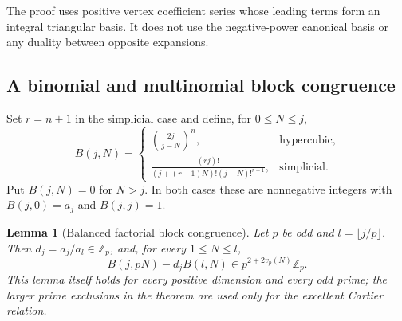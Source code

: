 \documentclass[11pt,a4paper]{article}
\newtheorem{lemma}[theorem]{Lemma}
\theoremstyle{definition}\newtheorem{definition}[theorem]{Definition}
\theoremstyle{remark}\newtheorem{remark}[theorem]{Remark}
\numberwithin{equation}{section}
\begin{document}
The proof uses positive vertex coefficient series whose leading
terms form an integral triangular basis.  It does not use the
negative-power canonical basis or any duality between opposite
expansions.

\subsection{A binomial and multinomial block congruence}

Set \(r=n+1\) in the simplicial case and define, for
\(0\leq N\leq j\),
\[
 B(j,N)=
 \begin{cases}
 \displaystyle\binom{2j}{j-N}^{n},&\text{hypercubic},\\[7pt]
 \displaystyle\frac{(rj)!}
 {(j+(r-1)N)!(j-N)!^{r-1}},&\text{simplicial}.
 \end{cases}
\]
Put \(B(j,N)=0\) for \(N>j\).
In both cases these are nonnegative integers with
\(B(j,0)=a_j\) and \(B(j,j)=1\).

\begin{lemma}[Balanced factorial block congruence]
\label{P:lem:positive-block}
Let \(p\) be odd and \(l=\lfloor j/p\rfloor\).
Then \(d_j=a_j/a_l\in\mathbb Z_p\), and, for every
\(1\leq N\leq l\),
\begin{equation}\label{P:eq:positive-block}
 B(j,pN)-d_j B(l,N)
 \in p^{2+2v_p(N)}\mathbb Z_p.
\end{equation}
This lemma itself holds for every positive dimension and every
odd prime; the larger prime exclusions in the theorem are used
only for the excellent Cartier relation.
\end{lemma}
\end{document}
